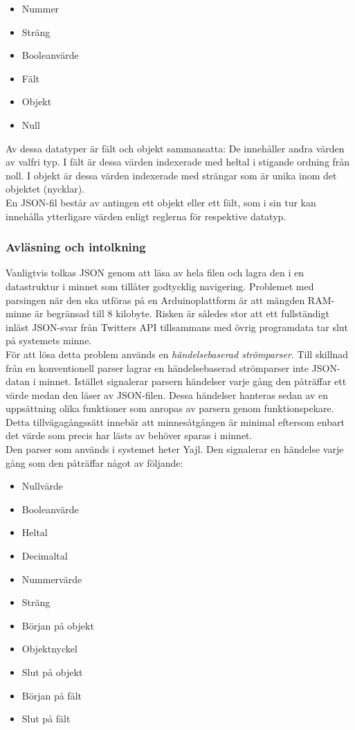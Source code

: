 \documentclass[a4paper,11pt]{article}
\begin{document}
	\begin{itemize}
	\item Nummer
    	\item Sträng
    	\item Booleanvärde
    	\item Fält
    	\item Objekt
    	\item Null
	\end{itemize}

Av dessa datatyper är fält och objekt sammansatta: De innehåller andra värden av valfri typ. I fält är dessa värden indexerade med heltal i stigande ordning från noll. I objekt är dessa värden indexerade med strängar som är unika inom det objektet (nycklar). \\

En JSON-fil består av antingen ett objekt eller ett fält, som i sin tur kan innehålla ytterligare värden enligt reglerna för respektive datatyp. \\

\subsubsection{Avläsning och intolkning}
Vanligtvis tolkas JSON genom att läsa av hela filen och lagra den i en datastruktur i minnet som tillåter godtycklig navigering. Problemet med parsingen när den ska utföras på en Arduinoplattform är att mängden RAM-minne är begränsad till 8 kilobyte. Risken är således stor att ett fullständigt inläst JSON-svar från Twitters API tillsammans med övrig programdata tar slut på systemets minne. \\

För att lösa detta problem används en {\it händelsebaserad strömparser}. Till skillnad från en konventionell parser lagrar en händelsebaserad strömparser inte JSON-datan i minnet. Istället signalerar parsern händelser varje gång den påträffar ett värde medan den läser av JSON-filen. Dessa händelser hanteras sedan av en uppsättning olika funktioner som anropas av parsern genom funktionspekare. Detta tillvägagångssätt innebär att minnesåtgången är minimal eftersom enbart det värde som precis har lästs av behöver sparas i minnet. \\

Den parser som används i systemet heter Yajl. Den signalerar en händelse varje gång som den påträffar något av följande:

	\begin{itemize}
    	\item Nullvärde
    	\item Booleanvärde
    	\item Heltal
    	\item Decimaltal
    	\item Nummervärde
    	\item Sträng
    	\item Början på objekt
    	\item Objektnyckel
    	\item Slut på objekt
    	\item Början på fält
    	\item Slut på fält
	\end{itemize}
	
\end{document}
